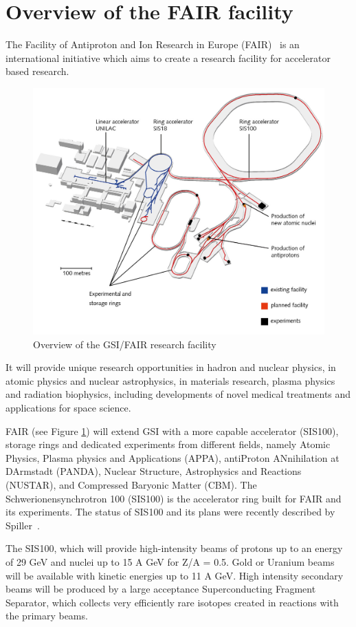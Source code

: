 
\section{Overview of the FAIR facility}
The Facility of Antiproton and Ion Research in Europe (\gls{FAIR})~\cite{Spiller_2020} is an international initiative which aims to create a research facility for accelerator based research. 
\begin{figure}[!h]
    \centering
    \includegraphics[width=0.65\columnwidth]{Chapter2/images/fair.jpg}
    \caption{Overview of the GSI/FAIR research facility~\cite{fair}}
    \label{fig:fair}
\end{figure}
It will provide unique research opportunities in hadron and nuclear physics, in atomic physics and nuclear astrophysics, in materials research, plasma physics and radiation biophysics, including developments of novel medical treatments and applications for space science. 
 
FAIR (see Figure \ref{fig:fair}) will extend GSI with a more capable accelerator (SIS100), storage rings and dedicated experiments from different fields, namely Atomic Physics,
Plasma physics and Applications (APPA), antiProton ANnihilation at DArmstadt
(PANDA), Nuclear Structure, Astrophysics and Reactions (NUSTAR), and Compressed Baryonic Matter (\gls{CBM}). The Schwerionensynchrotron 100 (SIS100) is
the accelerator ring built for FAIR and its experiments. The status of SIS100 and its plans were recently described by Spiller~\cite{Spiller_2020}.


The SIS100, which will provide high-intensity beams of protons up
to an energy of 29 GeV and nuclei up to 15 A GeV for Z/A = 0.5. Gold or Uranium beams will be available with kinetic energies up to 11 A GeV. High intensity secondary beams will be produced by a large acceptance Superconducting Fragment Separator, which collects very efficiently rare isotopes created in reactions with the primary beams. 